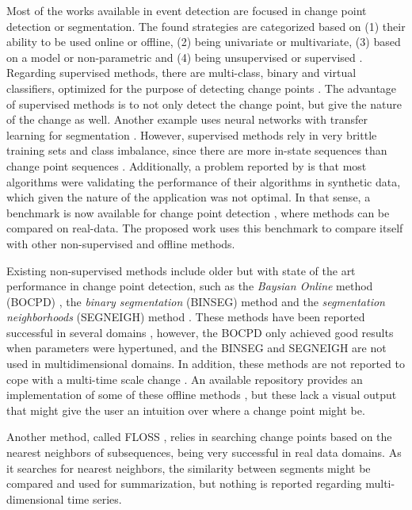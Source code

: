 Most of the works available in event detection are focused in change point detection or segmentation. The found strategies are categorized based on (1) their ability to be used online or offline, (2) being univariate or multivariate, (3) based on a model or non-parametric and (4) being unsupervised or supervised \cite{cpd_alan, review_1, review_2}. Regarding supervised methods, there are multi-class, binary and virtual classifiers, optimized for the purpose of detecting change points \cite{review_cpd_1}. The advantage of supervised methods is to not only detect the change point, but give the nature of the change as well. Another example uses neural networks with transfer learning for segmentation \cite{pedromatias}. However, supervised methods rely in very brittle training sets and class imbalance, since there are more in-state sequences than change point sequences \cite{review_cpd_1}. Additionally, a problem reported by \cite{cpd_alan} is that most algorithms were validating the performance of their algorithms in synthetic data, which given the nature of the application was not optimal. In that sense, a benchmark is now available for change point detection \cite{cpd_alan}, where methods can be compared on real-data. The proposed work uses this benchmark to compare itself with other non-supervised and offline methods.
\par
Existing non-supervised methods include older but with state of the art performance in change point detection, such as the \textit{Baysian Online} method (BOCPD) \cite{bocpd}, the \textit{binary segmentation} (BINSEG) method \cite{binseg} and the \textit{segmentation neighborhoods} (SEGNEIGH) method \cite{segneigh}. These methods have been reported successful in several domains \cite{cpd_alan}, however, the BOCPD only achieved good results when parameters were hypertuned, and the BINSEG and SEGNEIGH are not used in multidimensional domains. In addition, these methods are not reported to cope with a multi-time scale change \cite{cpd_alan}. An available repository provides an implementation of some of these offline methods \cite{review_2}, but these lack a visual output that might give the user an intuition over where a change point might be. 
\par
Another method, called FLOSS \cite{eamonn1}, relies in searching change points based on the nearest neighbors of subsequences, being very successful in real data domains. As it searches for nearest neighbors, the similarity between segments might be compared and used for summarization, but nothing is reported regarding multi-dimensional time series.
